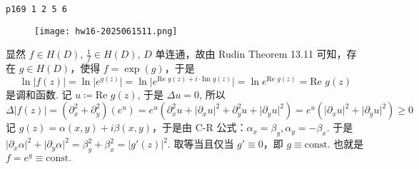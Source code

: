 \begin{lstlisting}
p169 1 2 5 6
\end{lstlisting}
\begin{exercise}
\begin{figure}[H]
\centering
\texttt{[image: hw16-2025061511.png]}
\label{}
\end{figure}
\end{exercise}
显然 $f\in H(D)$, $\frac{1}{f}\in H(D)$, $D$ 单连通，故由 Rudin Theorem 13.11 可知，存在 $g\in H(D)$，使得 $f=\exp(g)$，于是
\[
\ln \lvert f(z) \rvert=\ln \lvert e^{ g(z) } \rvert=\ln \lvert e^{ \text{Re }g(z)+i\cdot \text{Im }g(z) } \rvert=\ln e^{ \text{Re }g(z) }=\text{Re }g(z)
\]
是调和函数. 记 $u\coloneqq \text{Re }g(z)$, 于是 $\Delta u=0$, 所以
\[
\Delta \lvert f(z) \rvert=(\partial _{x}^{2}+\partial _{y}^{2})(e^{ u })=e^{ u }(\partial _{x}^{2}u+\lvert \partial _{x}u \rvert ^{2}+\partial^{2}_{y}u+\lvert \partial _{y}u \rvert ^{2})=e^{ u  }(\lvert \partial _{x}u \rvert ^{2}+\lvert \partial _{y}u \rvert ^{2})\geq 0
\]
记 $g(z)=\alpha(x,y)+i\beta(x,y)$，于是由 C-R 公式：$\alpha_{x}=\beta_{y},\alpha_{y}=-\beta_{x}$. 于是 $\lvert \partial_{x}\alpha \rvert ^{2}+\lvert \partial_{y}\alpha \rvert ^{2}=\beta_{y}^{2}+\beta_{x}^{2}=\lvert g'(z) \rvert ^{2}$. 取等当且仅当 $g'\equiv0$，即 $g\equiv\text{const.}$ 也就是 $f=e^{ g }\equiv\text{const.}$

